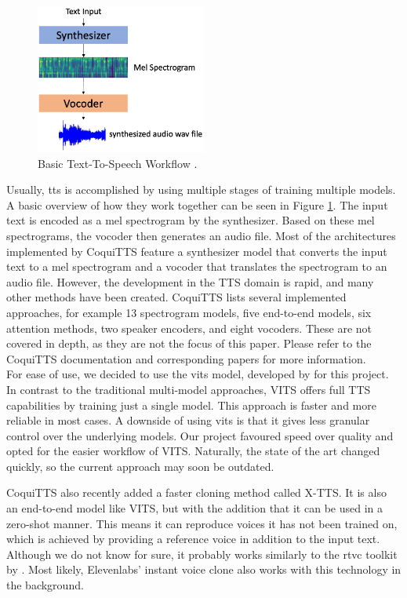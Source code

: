 \documentclass[
  a4paper,  %
  twoside,  %
  bibliography=totoc,
  headsepline,
  cleardoublepage=empty,
  parskip=half,
  draft=false
]{scrbook}
\begin{document}
\begin{figure}[h]
  \centering
  \includegraphics[width=0.5\textwidth]{./graphics/tts/tts-workflow.png}
  \caption{Basic Text-To-Speech Workflow \cite{jemineRealTimeVoiceCloning2019}.}
  \label{fig:tts-explainer}
\end{figure}

Usually, \gls{tts} is accomplished by using multiple stages of training multiple models. A basic overview of how they work together can be seen in Figure \ref{fig:tts-explainer}. The input text is encoded as a mel spectrogram by the synthesizer. Based on these mel spectrograms, the vocoder then generates an audio file. Most of the architectures implemented by CoquiTTS feature a synthesizer model that converts the input text to a mel spectrogram and a vocoder that translates the spectrogram to an audio file. However, the development in the TTS domain is rapid, and many other methods have been created. CoquiTTS lists several implemented approaches, for example 13 spectrogram models, five end-to-end models, six attention methods, two speaker encoders, and eight vocoders. These are not covered in depth, as they are not the focus of this paper. Please refer to the CoquiTTS documentation and corresponding papers for more information.\\
For ease of use, we decided to use the \gls{vits} model, developed by \citet{kimConditionalVariationalAutoencoder2021} for this project. In contrast to the traditional multi-model approaches, VITS offers full TTS capabilities by training just a single model. This approach is faster and more reliable in most cases. A downside of using \gls{vits} is that it gives less granular control over the underlying models. Our project favoured speed over quality and opted for the easier workflow of VITS. Naturally, the state of the art changed quickly, so the current approach may soon be outdated.

CoquiTTS also recently added a faster cloning method called X-TTS. It is also an end-to-end model like VITS, but with the addition that it can be used in a zero-shot manner. This means it can reproduce voices it has not been trained on, which is achieved by providing a reference voice in addition to the input text. Although we do not know for sure, it probably works similarly to the \gls{rtvc} toolkit by \citeauthor{jemineRealTimeVoiceCloning2019}. Most likely, Elevenlabs' instant voice clone also works with this technology in the background.
\end{document}

